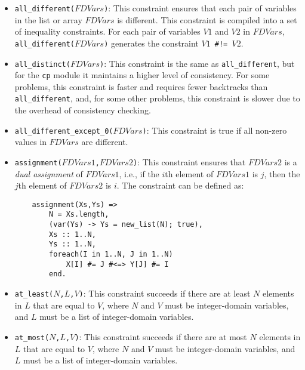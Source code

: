 \begin{itemize}
\item \texttt{all\_different($FDVars$)}: This constraint ensures that each pair of variables in the list or array $FDVars$ is different. This constraint is compiled into a set of inequality constraints. For each pair of variables $V1$ and $V2$ in $FDVars$, \texttt{all\_different($FDVars$)} generates the constraint {\tt $V1$ \verb+#!=+ $V2$}.

\item \texttt{all\_distinct($FDVars$)}: This constraint is the same as \texttt{all\_different}, but for the \texttt{cp} module it maintains a higher level of consistency. For some problems, this constraint is faster and requires fewer backtracks than \texttt{all\_different}, and, for some other problems, this constraint is slower due to the overhead of consistency checking.

\item \texttt{all\_different\_except\_0($FDVars$)}: This constraint is true if all non-zero values in $FDVars$ are different.
\item \texttt{assignment($FDVars1$,$FDVars2$)}: This constraint ensures that $FDVars2$ is a \emph{dual assignment} of $FDVars1$, i.e., if the $i$th element of $FDVars1$ is $j$, then the $j$th element of $FDVars2$ is $i$. The constraint can be defined as:
\begin{verbatim}
    assignment(Xs,Ys) =>
        N = Xs.length,
        (var(Ys) -> Ys = new_list(N); true),
        Xs :: 1..N,
        Ys :: 1..N,
        foreach(I in 1..N, J in 1..N)
            X[I] #= J #<=> Y[J] #= I
        end.
\end{verbatim}

\item \texttt{at\_least($N$,$L$,$V$)}: This constraint succeeds if there are at least $N$ elements in $L$ that are equal to $V$, where $N$ and $V$ must be integer-domain variables, and $L$ must be a list of integer-domain variables.

\item \texttt{at\_most($N$,$L$,$V$)}: This constraint succeeds if there are at most $N$ elements in $L$ that are equal to $V$, where $N$ and $V$ must be integer-domain variables, and $L$ must be a list of integer-domain variables.


\end{itemize}
